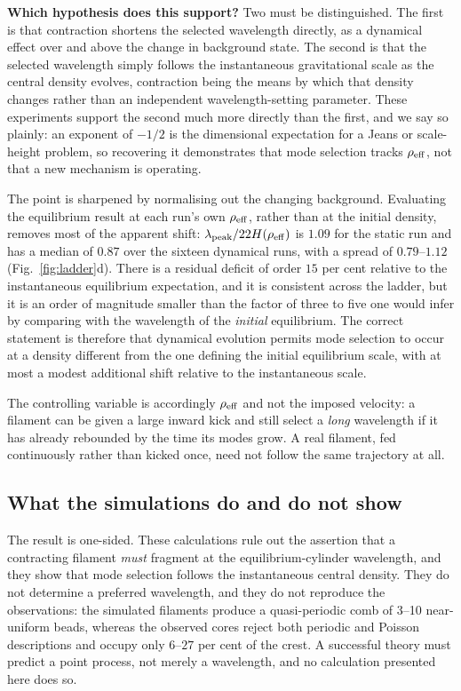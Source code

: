 \documentclass[usenatbib,twoside,twocolumn]{mnras}
\begin{document}
\smallskip\noindent\textbf{Which hypothesis does this support?} Two must be distinguished. The first is that contraction shortens the selected wavelength directly, as a dynamical effect over and above the change in background state. The second is that the selected wavelength simply follows the instantaneous gravitational scale as the central density evolves, contraction being the means by which that density changes rather than an independent wavelength-setting parameter. These experiments support the second much more directly than the first, and we say so plainly: an exponent of $-1/2$ is the dimensional expectation for a Jeans or scale-height problem, so recovering it demonstrates that mode selection tracks $\rho_{\rm eff}$, not that a new mechanism is operating.

The point is sharpened by normalising out the changing background. Evaluating the equilibrium result at each run's own $\rho_{\rm eff}$, rather than at the initial density, removes most of the apparent shift: $\lambda_{\rm peak}/22H(\rho_{\rm eff})$ is $1.09$ for the static run and has a median of $0.87$ over the sixteen dynamical runs, with a spread of $0.79$--$1.12$ (Fig.~\ref{fig:ladder}d). There is a residual deficit of order $15$ per cent relative to the instantaneous equilibrium expectation, and it is consistent across the ladder, but it is an order of magnitude smaller than the factor of three to five one would infer by comparing with the wavelength of the \emph{initial} equilibrium. The correct statement is therefore that dynamical evolution permits mode selection to occur at a density different from the one defining the initial equilibrium scale, with at most a modest additional shift relative to the instantaneous scale.

The controlling variable is accordingly $\rho_{\rm eff}$ and not the imposed velocity: a filament can be given a large inward kick and still select a \emph{long} wavelength if it has already rebounded by the time its modes grow. A real filament, fed continuously rather than kicked once, need not follow the same trajectory at all.

\subsection{What the simulations do and do not show}
\label{sec:simsummary}

The result is one-sided. These calculations rule out the assertion that a contracting filament \emph{must} fragment at the equilibrium-cylinder wavelength, and they show that mode selection follows the instantaneous central density. They do not determine a preferred wavelength, and they do not reproduce the observations: the simulated filaments produce a quasi-periodic comb of 3--10 near-uniform beads, whereas the observed cores reject both periodic and Poisson descriptions and occupy only $6$--$27$ per cent of the crest. A successful theory must predict a point process, not merely a wavelength, and no calculation presented here does so.
\end{document}
